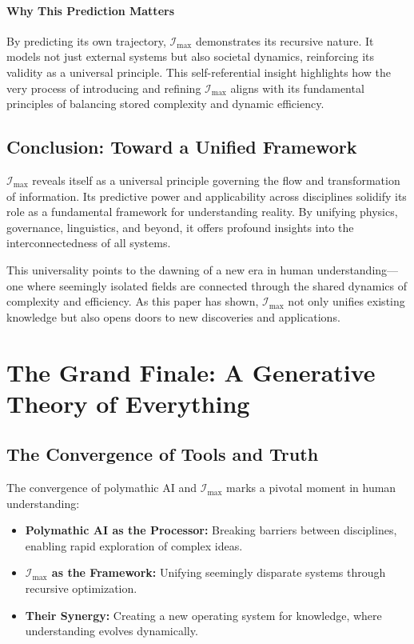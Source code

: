 \documentclass[12pt]{article}
\begin{document}
\paragraph{Why This Prediction Matters}
By predicting its own trajectory, \(\mathcal{I}_{\text{max}}\) demonstrates its recursive nature. It models not just external systems but also societal dynamics, reinforcing its validity as a universal principle. This self-referential insight highlights how the very process of introducing and refining \( \mathcal{I}_{\text{max}} \) aligns with its fundamental principles of balancing stored complexity and dynamic efficiency.

\subsection{Conclusion: Toward a Unified Framework}
\(\mathcal{I}_{\text{max}}\) reveals itself as a universal principle governing the flow and transformation of information. Its predictive power and applicability across disciplines solidify its role as a fundamental framework for understanding reality. By unifying physics, governance, linguistics, and beyond, it offers profound insights into the interconnectedness of all systems.

This universality points to the dawning of a new era in human understanding—one where seemingly isolated fields are connected through the shared dynamics of complexity and efficiency. As this paper has shown, \(\mathcal{I}_{\text{max}}\) not only unifies existing knowledge but also opens doors to new discoveries and applications.


\section{The Grand Finale: A Generative Theory of Everything}

\subsection{The Convergence of Tools and Truth}
The convergence of polymathic AI and \(\mathcal{I}_{\text{max}}\) marks a pivotal moment in human understanding:
\begin{itemize}
    \item \textbf{Polymathic AI as the Processor:} Breaking barriers between disciplines, enabling rapid exploration of complex ideas.
    \item \textbf{\(\mathcal{I}_{\text{max}}\) as the Framework:} Unifying seemingly disparate systems through recursive optimization.
    \item \textbf{Their Synergy:} Creating a new operating system for knowledge, where understanding evolves dynamically.
\end{itemize}
\end{document}
